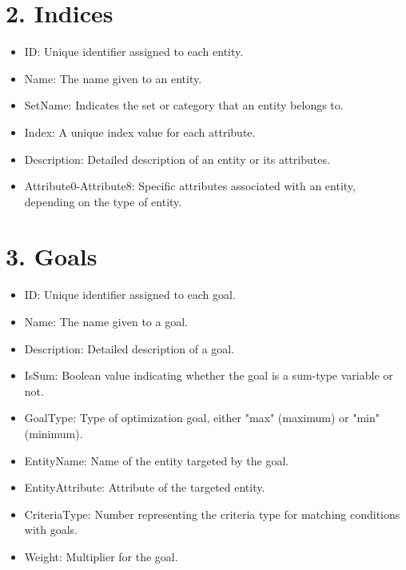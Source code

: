 \documentclass{article}
\begin{document}
\section*{2. Indices}
\begin{itemize}
    \item ID: Unique identifier assigned to each entity.
    \item Name: The name given to an entity.
    \item SetName: Indicates the set or category that an entity belongs to.
    \item Index: A unique index value for each attribute.
    \item Description: Detailed description of an entity or its attributes.
    \item Attribute0-Attribute8: Specific attributes associated with an entity, depending on the type of entity.
\end{itemize}

\section*{3. Goals}
\begin{itemize}
    \item ID: Unique identifier assigned to each goal.
    \item Name: The name given to a goal.
    \item Description: Detailed description of a goal.
    \item IsSum: Boolean value indicating whether the goal is a sum-type variable or not.
    \item GoalType: Type of optimization goal, either "max" (maximum) or "min" (minimum).
    \item EntityName: Name of the entity targeted by the goal.
    \item EntityAttribute: Attribute of the targeted entity.
    \item CriteriaType: Number representing the criteria type for matching conditions with goals.
    \item Weight: Multiplier for the goal.
\end{itemize}
\end{document}

